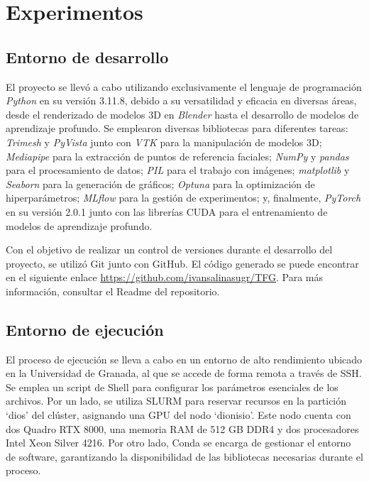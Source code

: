 \chapter{Experimentos}
\thispagestyle{empty}

\section{Entorno de desarrollo}

El proyecto se llevó a cabo utilizando exclusivamente el lenguaje de programación \textit{Python} en su versión 3.11.8, debido a su versatilidad y eficacia en diversas áreas, desde el renderizado de modelos 3D en \textit{Blender} hasta el desarrollo de modelos de aprendizaje profundo. Se emplearon diversas bibliotecas para diferentes tareas: \textit{Trimesh} y \textit{PyVista} junto con \textit{VTK} para la manipulación de modelos 3D; \textit{Mediapipe} para la extracción de puntos de referencia faciales; \textit{NumPy} y \textit{pandas} para el procesamiento de datos; \textit{PIL} para el trabajo con imágenes; \textit{matplotlib} y \textit{Seaborn} para la generación de gráficos; \textit{Optuna} para la optimización de hiperparámetros; \textit{MLflow} para la gestión de experimentos; y, finalmente, \textit{PyTorch} en su versión 2.0.1 junto con las librerías CUDA para el entrenamiento de modelos de aprendizaje profundo.

Con el objetivo de realizar un control de versiones durante el desarrollo del proyecto, se utilizó Git junto con GitHub. El código generado se puede encontrar en el siguiente enlace \url{https://github.com/ivansalinasugr/TFG}. Para más información, consultar el Readme del repositorio.

\section{Entorno de ejecución}

El proceso de ejecución se lleva a cabo en un entorno de alto rendimiento ubicado en la Universidad de Granada, al que se accede de forma remota a través de SSH. Se emplea un script de Shell para configurar los parámetros esenciales de los archivos. Por un lado, se utiliza SLURM para reservar recursos en la partición \enquote*{dios} del clúster, asignando una GPU del nodo \enquote*{dionisio}. Este nodo cuenta con dos Quadro RTX 8000, una memoria RAM de 512 GB DDR4 y dos procesadores Intel Xeon Silver 4216. Por otro lado, Conda se encarga de gestionar el entorno de software, garantizando la disponibilidad de las bibliotecas necesarias durante el proceso.

